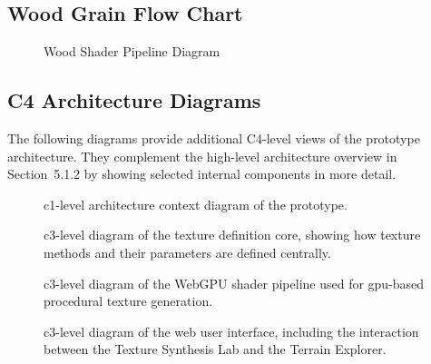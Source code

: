 \subsection{Wood Grain Flow Chart}
\label{app:appendix-woodgrain-flowchart}

\begin{figure}[H]
    \centering
    {Wood Shader Pipeline Diagram}
    \label{fig:woodgrain-flowchart}
\end{figure}

\subsection{C4 Architecture Diagrams}
\label{appendix:c4-architecture-diagrams}

The following diagrams provide additional C4-level views of the prototype architecture. They complement the high-level architecture overview in Section~5.1.2 by showing selected internal components in more detail.

\begin{figure}[H]
    \centering
    {\gls{c1}-level architecture context diagram of the prototype.}
    \label{fig:c4-c1}
\end{figure}

\begin{figure}[H]
    \centering
    {\gls{c3}-level diagram of the texture definition core, showing how texture methods and their parameters are defined centrally.}
    \label{fig:c4-texturedefinitioncore}
\end{figure}

\begin{figure}[H]
    \centering
    {\gls{c3}-level diagram of the WebGPU shader pipeline used for \gls{gpu}-based procedural texture generation.}
    \label{fig:c4-webgpushaderpipeline}
\end{figure}

\begin{figure}[H]
    \centering
    {\gls{c3}-level diagram of the web user interface, including the interaction between the Texture Synthesis Lab and the Terrain Explorer.}
    \label{fig:c4-webui}
\end{figure}